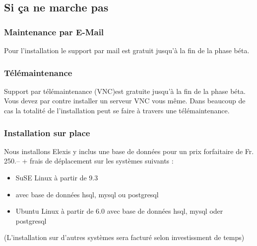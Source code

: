 \subsection{Si ça ne marche pas}
\subsubsection{Maintenance par E-Mail}
Pour l'installation le support par mail  est gratuit jusqu'à la fin de la phase béta.
\subsubsection{Télémaintenance}
Support par télémaintenance  (VNC)est gratuite jusqu'à la fin de la phase béta. Vous devez par contre installer un serveur VNC vous même. Dans beaucoup de cas la totalité de l'installation peut se faire à travers une télémaintenance.   

\subsubsection{Installation sur place}

Nous installons Elexis y inclus une base de données pour un prix forfaitaire de Fr. 250.-- + frais de déplacement sur les systèmes suivants : 
\begin{itemize}
 \item SuSE Linux à partir de  9.3
\item avec base de données hsql, mysql ou postgresql
\item Ubuntu Linux à partir de 6.0 avec base de données  hsql, mysql oder postgresql
\end{itemize}
(L'installation sur d'autres systèmes sera facturé selon investissment de temps) 
